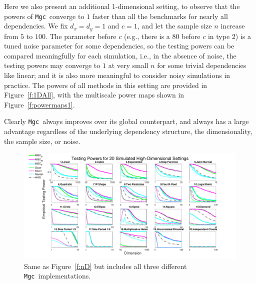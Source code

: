 \documentclass[11pt]{article}
\providecommand{\sct}[1]{{\sc \texttt{#1}}}
\newcommand{\Mgc}{\sct{Mgc}}
\begin{document}
Here we also present an additional 1-dimensional setting, to observe that the powers of \Mgc~converge to $1$ faster than all the benchmarks for nearly all dependencies. We fix $d_{x}=d_{y}=1$ and $c=1$, and let the sample size $n$ increase from $5$ to $100$. The parameter before $c$ (e.g., there is a $80$ before $c$ in type 2) is a tuned noise parameter for some dependencies, so the testing powers can be compared meaningfully for each simulation, i.e., in the absence of noise, the testing powers may converge to $1$ at very small $n$ for some trivial dependencies like linear; and it is also more meaningful to consider noisy simulations in practice. The powers of all methods in this setting are provided in Figure~\ref{f:1DAll}, with the multiscale power maps shown in Figure~\ref{f:powermaps1}.

Clearly \Mgc~always improves over its global counterpart, and always has a large advantage regardless of the underlying dependency structure, the dimensionality, the sample size, or noise.

\begin{figure}[htbp]
\includegraphics[width=1.0\textwidth]{../Figures/FigHDPowerAll}
\caption{
Same as Figure~\ref{f:nD} but includes all three different \Mgc~implementations.}
\label{f:nDAll}
\end{figure}
\end{document}
